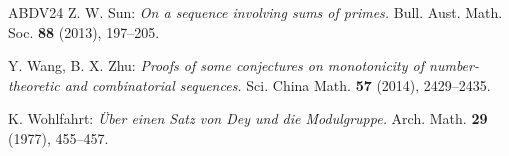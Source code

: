 \documentclass[11pt,reqno]{amsart}
\theoremstyle{plain}
\theoremstyle{remark}
\theoremstyle{definition}
\numberwithin{equation}{section}
\begin{document}
\begin{thebibliography}{ABDV24}
 Z.
W. Sun: \emph{On a sequence involving sums of primes.} Bull. Aust. Math. Soc. \textbf{88} (2013), 197--205.

 Y. Wang, B. X. Zhu: \emph{Proofs of some conjectures on monotonicity of number-theoretic and combinatorial sequences.\/} 
Sci. China Math. \textbf{57} (2014), 2429--2435.


 K. Wohlfahrt: \emph{\"Uber einen Satz von Dey und die Modulgruppe.\/} Arch. Math. \textbf{29} (1977), 455--457.


\end{thebibliography}
\end{document}
